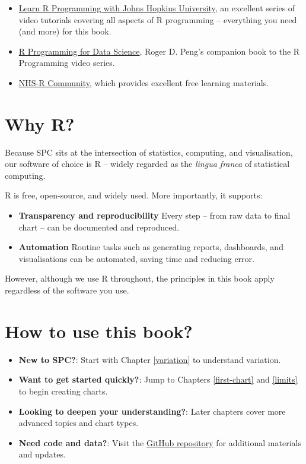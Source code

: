 \documentclass[
]{book}
\begin{document}
\begin{itemize}
\item
  \href{https://www.youtube.com/playlist?list=PLVext98k2evi8mDNRo4MwIgVgSmwM3cS8}{Learn R Programming with Johns Hopkins University}, an excellent series of video tutorials covering all aspects of R programming -- everything you need (and more) for this book.
\item
  \href{https://bookdown.org/rdpeng/rprogdatascience/}{R Programming for Data Science}, Roger D. Peng's companion book to the R Programming video series.
\item
  \href{https://nhsrcommunity.com/}{NHS-R Community}, which provides excellent free learning materials.
\end{itemize}

\section*{Why R?}\label{why-r}

Because SPC sits at the intersection of statistics, computing, and visualisation, our software of choice is R -- widely regarded as the \emph{lingua franca} of statistical computing.

R is free, open-source, and widely used. More importantly, it supports:

\begin{itemize}
\item
  \textbf{Transparency and reproducibility}
  Every step -- from raw data to final chart -- can be documented and reproduced.
\item
  \textbf{Automation}
  Routine tasks such as generating reports, dashboards, and visualisations can be automated, saving time and reducing error.
\end{itemize}

However, although we use R throughout, the principles in this book apply regardless of the software you use.

\section*{How to use this book?}\label{how-to-use-this-book}

\begin{itemize}
\item
  \textbf{New to SPC?}: Start with Chapter \ref{variation} to understand variation.
\item
  \textbf{Want to get started quickly?}: Jump to Chapters \ref{first-chart} and \ref{limits} to begin creating charts.
\item
  \textbf{Looking to deepen your understanding?}: Later chapters cover more advanced topics and chart types.
\item
  \textbf{Need code and data?}: Visit the \href{https://github.com/anhoej/spc4hc}{GitHub repository} for additional materials and updates.
\end{itemize}
\end{document}
